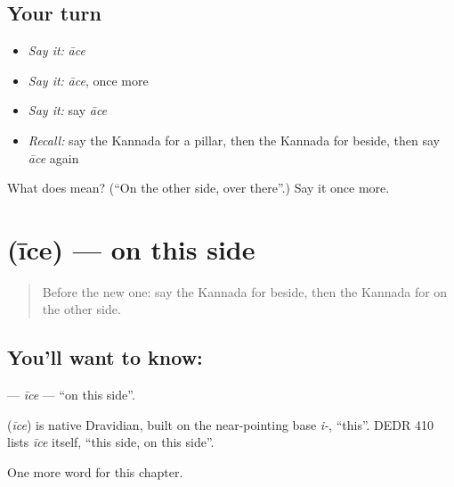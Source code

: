 \subsection*{Your turn}
\begin{itemize}
\raggedright
  \item \emph{Say it:} \emph{āce}
  \item \emph{Say it:} \emph{āce}, once more
  \item \emph{Say it:} say \emph{āce}
  \item \emph{Recall:} say the Kannada for a pillar, then the Kannada for beside, then say \emph{āce} again
\end{itemize}

\begin{tcolorbox}[breakable,colback=teal!4,colframe=teal!35!black,title={Before you move on}]
What does  mean? (\textquotedblleft{}On the other side, over there\textquotedblright{}.) Say it once more.
\end{tcolorbox}
\section[\texorpdfstring{\kn{ಈಚೆ} (īce)}{ಈಚೆ (īce)}]{ (īce) — on this side}

\label{lesson:KA-C175-ice}



\begin{quote}
Before the new one: say the Kannada for beside, then the Kannada for on the other side.
\end{quote}

\subsection*{You'll want to know: }
\textbf{} — \emph{īce} — \textquotedblleft{}on this side\textquotedblright{}.

\begin{cousinweb}
\textbf{} (\emph{īce}) is native Dravidian, built on the near-pointing base \emph{i-}, \textquotedblleft{}this\textquotedblright{}. DEDR 410 lists \emph{īce} itself, \textquotedblleft{}this side, on this side\textquotedblright{}.
\end{cousinweb}

\begin{grammarlens}[title={What you've built}]
One more word for this chapter.
\end{grammarlens}

